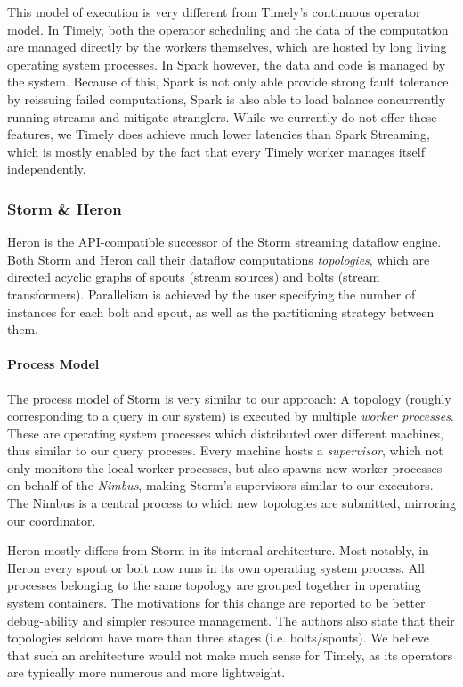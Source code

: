 This model of execution is very different from Timely's continuous operator
model. In Timely, both the operator scheduling and the data of the
computation are managed directly by the workers themselves, which are hosted
by long living operating system processes. In Spark however, the data and code
is managed by the system. Because of this, Spark is not only able provide strong
fault tolerance by reissuing failed computations, Spark is also able to load
balance concurrently running streams and mitigate stranglers. While we currently
do not offer these features, we Timely does achieve much lower latencies than
Spark Streaming, which is mostly enabled by the fact that every Timely
worker manages itself independently.


\subsubsection{Storm \& Heron}

Heron \cite{heron} is the API-compatible successor of the Storm \cite{storm}
streaming dataflow engine.
Both Storm and Heron call their dataflow computations \emph{topologies}, which 
are directed acyclic graphs of spouts (stream sources) and bolts
(stream transformers). Parallelism is achieved by the user specifying the
number of instances for each bolt and spout, as well as the partitioning
strategy between them.

\paragraph{Process Model}

The process model of Storm is very similar to our approach: A topology
(roughly corresponding to a query in our system) is executed by multiple
\emph{worker processes}. These are operating system processes which distributed
over different machines, thus similar to our query proceses. Every machine hosts
a \emph{supervisor}, which not only monitors the local worker processes, but also spawns new worker
processes on behalf of the \emph{Nimbus}, making Storm's supervisors similar to our executors.
The Nimbus is a central process to which new topologies are submitted, mirroring our coordinator.

Heron mostly differs from Storm in its internal architecture. Most notably, in
Heron every spout or bolt now runs in its own operating system process. All processes
belonging to the same topology are grouped together in operating system containers.
The motivations for this change are reported to be better debug-ability
and simpler resource management. The authors also state that their topologies
seldom have more than three stages (i.e. bolts/spouts). We believe that such
an architecture would not make much sense for Timely, as its operators are typically
more numerous and more lightweight.

